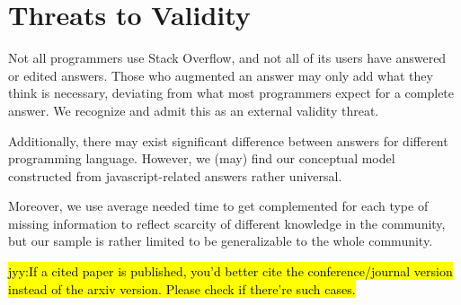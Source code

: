 \documentclass[10pt,conference]{IEEEtran}
\newcommand{\jyy}[1]{\sethlcolor{yellow}\hl{jyy:#1}\xspace}
\begin{document}
\section {Threats to Validity}
Not all programmers use Stack Overflow, and not all of its users have answered or edited answers. Those who augmented an answer may only add what they think is necessary, deviating from what most programmers expect for a complete answer. We recognize and admit this as an external validity threat. 

Additionally, there may exist significant difference between answers for different programming language. However, we (may) find our conceptual model constructed from javascript-related answers rather universal.

Moreover, we use average needed time to get complemented for each type of missing information to reflect scarcity of different knowledge in the community, but our sample is rather limited to be generalizable to the whole community. 


\jyy{If a cited paper is published, you'd better cite the conference/journal version instead of the arxiv version. Please check if there're such cases.}



\end{document}
